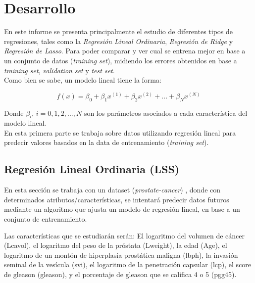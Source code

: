 \documentclass[10pt]{article}
\begin{document}
\section*{Desarrollo}
En este informe se presenta principalmente el estudio de diferentes tipos de regresiones, tales como la \textit{Regresión Lineal Ordinaria}, \textit{Regresión de Ridge} y \textit{Regresión de Lasso}. Para poder comparar y ver cual se entrena mejor en base a un conjunto de datos (\textit{training set}), midiendo los errores obtenidos en base a \textit{training set}, \textit{validation set} y \textit{test set}.\\

Como bien se sabe, un modelo lineal tiene la forma:

\begin{equation}
f(x) = \beta_0 + \beta_1 x^{(1)} + \beta_2 x^{(2)} + ... + \beta_N x^{(N)}
\label{f_rlineal}
\end{equation}

Donde $\beta_i$, $i = 0, 1, 2,..., N$ son los parámetros asociados a cada característica del modelo lineal.\\

En esta primera parte se trabaja sobre datos utilizando regresión lineal para predecir valores basados en la data de entrenamiento (\textit{training set}).

\subsection{Regresión Lineal Ordinaria (LSS)}

En esta sección se trabaja con un dataset (\textit{prostate-cancer}) \cite{friedman2001elements}, donde con determinados atributos/características, se intentará predecir datos futuros mediante un algoritmo que ajusta un modelo de regresión lineal, en base a un conjunto de entrenamiento.

Las características que se estudiarán serán: El logaritmo del volumen de cáncer (Lcavol), el logaritmo del peso de la próstata (Lweight), la edad (Age), el logaritmo de un montón de hiperplasia prostática maligna (lbph), la invasión seminal de la vesícula (svi), el logaritmo de la penetración capsular (lcp), el score de gleason (gleason), y el porcentaje de gleason que se califica 4 o 5 (pgg45).
\end{document}
